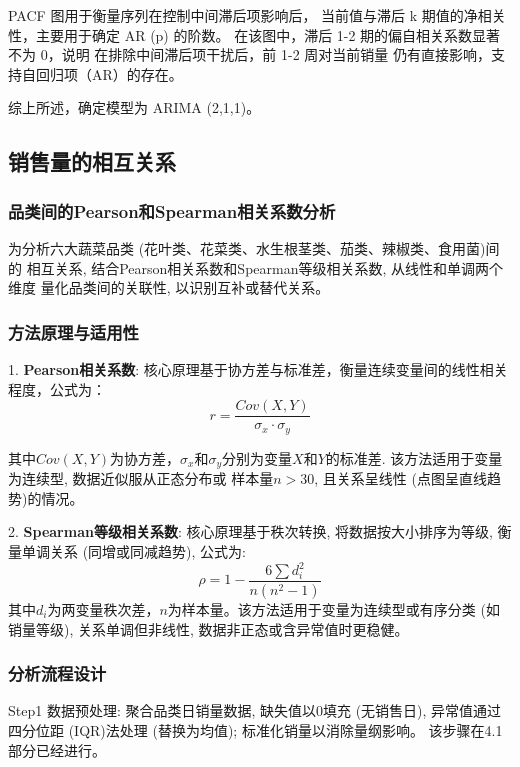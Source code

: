 \documentclass{cumcmthesis}
\begin{document}
PACF 图用于衡量序列在控制中间滞后项影响后，
当前值与滞后 k 期值的净相关性，主要用于确定 AR (p) 的阶数。
在该图中，滞后 1-2 期的偏自相关系数显著不为 0，说明
在排除中间滞后项干扰后，前 1-2 周对当前销量
仍有直接影响，支持自回归项（AR）的存在。

综上所述，确定模型为 ARIMA (2,1,1)。


\subsection{销售量的相互关系}

\subsubsection{品类间的Pearson和Spearman相关系数分析}
为分析六大蔬菜品类 (花叶类、花菜类、水生根茎类、茄类、辣椒类、食用菌)间的
相互关系, 结合Pearson相关系数和Spearman等级相关系数, 从线性和单调两个维度
量化品类间的关联性, 以识别互补或替代关系。

\subsubsection{方法原理与适用性}
1. \textbf{Pearson相关系数}:   
核心原理基于协方差与标准差，衡量连续变量间的线性相关程度，公式为：  
\begin{equation}
r=\frac{Cov(X,Y)}{\sigma_x \cdot \sigma_y}
\end{equation}  

其中$Cov(X,Y)$为协方差，$\sigma_x$和$\sigma_y$分别为变量$X$和$Y$的标准差.  
该方法适用于变量为连续型, 数据近似服从正态分布或
样本量$n>30$, 且关系呈线性 (点图呈直线趋势)的情况。


2. \textbf{Spearman等级相关系数}:   
核心原理基于秩次转换, 将数据按大小排序为等级, 衡量单调关系 (同增或同减趋势), 公式为: 
\begin{equation}
\rho=1-\frac{6\sum d_i^2}{n(n^2-1)}
\end{equation}  
其中$d_i$为两变量秩次差，$n$为样本量。该方法适用于变量为连续型或有序分类
 (如销量等级), 关系单调但非线性, 数据非正态或含异常值时更稳健。

\subsubsection{分析流程设计}
    Step1 数据预处理: 聚合品类日销量数据, 缺失值以0填充 (无销售日), 
    异常值通过四分位距 (IQR)法处理 (替换为均值); 标准化销量以消除量纲影响。
    该步骤在4.1部分已经进行。
   
\end{document}

